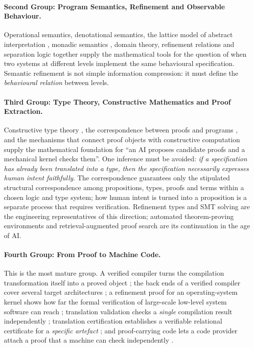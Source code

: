 \paragraph{Second Group: Program Semantics, Refinement and Observable Behaviour.}
Operational semantics, denotational semantics, the lattice model of abstract interpretation
\cite{cousot1977}, monadic semantics \cite{moggi1991,plotkin2002}, domain theory,
refinement relations \cite{hoare1969} and separation logic \cite{appel2007} together supply
the mathematical tools for the question of when two systems at different levels implement
the same behavioural specification. Semantic refinement is not simple information
compression: it must define the \emph{behavioural relation} between levels.

\paragraph{Third Group: Type Theory, Constructive Mathematics and Proof Extraction.}
Constructive type theory \cite{hott2013}, the correspondence between proofs and programs
\cite{howard1980}, and the mechanisms that connect proof objects with constructive
computation supply the mathematical foundation for ``an AI proposes candidate proofs and a
mechanical kernel checks them''. One inference must be avoided: \emph{if a specification
has already been translated into a type, then the specification necessarily expresses human
intent faithfully}. The correspondence guarantees only the stipulated structural
correspondence among propositions, types, proofs and terms within a chosen logic and type
system; how human intent is turned into a proposition is a separate process that requires
verification. Refinement types \cite{rondon2008} and SMT solving \cite{z32008} are the
engineering representatives of this direction; automated theorem-proving environments and
retrieval-augmented proof search \cite{leandojo2023,leancopilot2024} are its continuation
in the age of AI.

\paragraph{Fourth Group: From Proof to Machine Code.}
This is the most mature group. A verified compiler turns the compilation transformation
itself into a proved object \cite{leroy2009}; the back ends of a verified compiler cover
several target architectures \cite{cakeml2019}; a refinement proof for an operating-system
kernel shows how far the formal verification of large-scale low-level system software can
reach \cite{klein2009}; translation validation checks a \emph{single} compilation result
independently \cite{necula2000}; translation certification establishes a verifiable
relational certificate for a \emph{specific artefact} \cite{krijnen2024}; and proof-carrying
code lets a code provider attach a proof that a machine can check independently
\cite{necula1997}.

